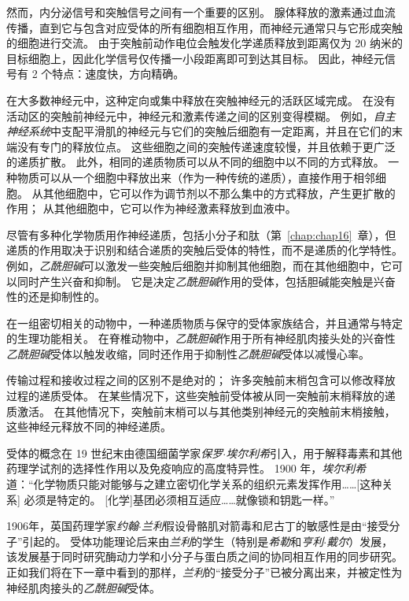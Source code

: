 然而，内分泌信号和突触信号之间有一个重要的区别。
腺体释放的激素通过血流传播，直到它与包含对应受体的所有细胞相互作用，而神经元通常只与它形成突触的细胞进行交流。
由于突触前动作电位会触发化学递质释放到距离仅为 20 纳米的目标细胞上，因此化学信号仅传播一小段距离即可到达其目标。 
因此，神经元信号有 2 个特点：速度快，方向精确。


在大多数神经元中，这种定向或集中释放在突触神经元的活跃区域完成。
在没有活动区的突触前神经元中，神经元和激素传递之间的区别变得模糊。
例如，\textit{自主神经系统}中支配平滑肌的神经元与它们的突触后细胞有一定距离，并且在它们的末端没有专门的释放位点。
这些细胞之间的突触传递速度较慢，并且依赖于更广泛的递质扩散。
此外，相同的递质物质可以从不同的细胞中以不同的方式释放。
一种物质可以从一个细胞中释放出来（作为一种传统的递质），直接作用于相邻细胞。
从其他细胞中，它可以作为调节剂以不那么集中的方式释放，产生更扩散的作用；
从其他细胞中，它可以作为神经激素释放到血液中。


尽管有多种化学物质用作神经递质，包括小分子和肽（第~\ref{chap:chap16}~章），但递质的作用取决于识别和结合递质的突触后受体的特性，而不是递质的化学特性。
例如，\textit{乙酰胆碱}可以激发一些突触后细胞并抑制其他细胞，而在其他细胞中，它可以同时产生兴奋和抑制。
它是决定\textit{乙酰胆碱}作用的受体，包括胆碱能突触是兴奋性的还是抑制性的。


在一组密切相关的动物中，一种递质物质与保守的受体家族结合，并且通常与特定的生理功能相关。
在脊椎动物中，\textit{乙酰胆碱}作用于所有神经肌肉接头处的兴奋性\textit{乙酰胆碱}受体以触发收缩，同时还作用于抑制性\textit{乙酰胆碱}受体以减慢心率。


传输过程和接收过程之间的区别不是绝对的；
许多突触前末梢包含可以修改释放过程的递质受体。
在某些情况下，这些突触前受体被从同一突触前末梢释放的递质激活。
在其他情况下，突触前末梢可以与其他类别神经元的突触前末梢接触，这些神经元释放不同的神经递质。


受体的概念在 19 世纪末由德国细菌学家\textit{保罗$\cdot$埃尔利希}引入，用于解释毒素和其他药理学试剂的选择性作用以及免疫响应的高度特异性。
1900 年，\textit{埃尔利希}道：“化学物质只能对能够与之建立密切化学关系的组织元素发挥作用……[这种关系] 必须是特定的。
[化学]基团必须相互适应……就像锁和钥匙一样。”


1906年，英国药理学家\textit{约翰$\cdot$兰利}假设骨骼肌对箭毒和尼古丁的敏感性是由“接受分子”引起的。
受体功能理论后来由\textit{兰利}的学生（特别是\textit{希勒}和\textit{亨利$\cdot$戴尔}）发展，该发展基于同时研究酶动力学和小分子与蛋白质之间的协同相互作用的同步研究。
正如我们将在下一章中看到的那样，\textit{兰利}的“接受分子”已被分离出来，并被定性为神经肌肉接头的\textit{乙酰胆碱}受体。


